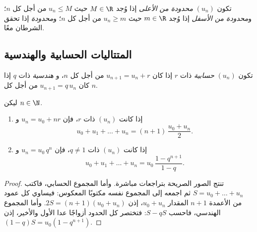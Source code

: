 \begin{definition}\label{def:g12:seq:bounded}
تكون  $(u_n)$ \emph{محدودة من الأعلى} إذا وُجد
$M \in \R$ حيث $u_n \leq M$ من أجل كل $n$؛ و\emph{محدودة من الأسفل} إذا وُجد
$m \in \R$ حيث $u_n \geq m$ من أجل كل $n$؛ و\emph{محدودة} إذا تحقق
الشرطان معًا.
\end{definition}

\subsection{المتتاليات الحسابية والهندسية}

\begin{definition}\label{def:g12:seq:arith-geom}
تكون  $(u_n)$ \emph{حسابية} ذات 
$r$ إذا كان $u_{n+1} = u_n + r$ من أجل كل $n$، و
\emph{هندسية} ذات  $q$ إذا كان
$u_{n+1} = q\,u_n$ من أجل كل $n$.
\end{definition}

\begin{proposition}\label{prop:g12:seq:arith-geom}
ليكن $n \in \N$.
\begin{enumerate}
  \item إذا كانت $(u_n)$  ذات  $r$، فإن
        $u_n = u_0 + nr$ و
        \[
        u_0 + u_1 + \dots + u_n = (n+1)\,\frac{u_0 + u_n}{2}.
        \]
  \item إذا كانت $(u_n)$  ذات  $q \neq 1$، فإن
        $u_n = u_0\, q^n$ و
        \[
        u_0 + u_1 + \dots + u_n = u_0\,\frac{1 - q^{n+1}}{1 - q}.
        \]
\end{enumerate}
\end{proposition}

\begin{proof}
تنتج الصور الصريحة بتراجعات مباشرة. وأما المجموع الحسابي، فاكتب
$S = u_0 + \dots + u_n$ ثم اجمعه إلى المجموع نفسه مكتوبًا  المعكوس:
فيساوي كل عمود من الأعمدة $n+1$ المقدار $u_0 + u_n$، إذن $2S = (n+1)(u_0+u_n)$.
وأما المجموع الهندسي، فاحسب $S - qS$: فتختصر كل الحدود أزواجًا عدا
الأول والأخير، إذن $(1-q)S = u_0(1 - q^{n+1})$.
\end{proof}

